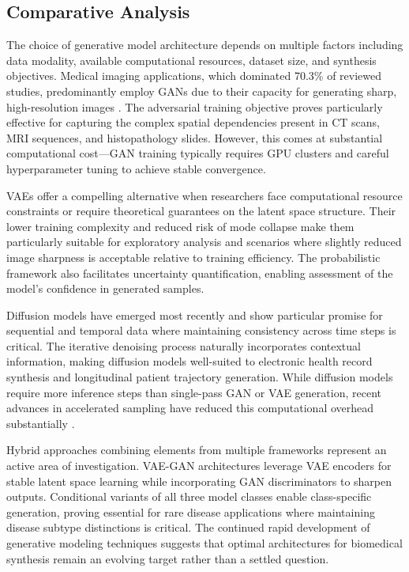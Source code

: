 \subsection{Comparative Analysis}

The choice of generative model architecture depends on multiple factors including data modality, available computational resources, dataset size, and synthesis objectives. Medical imaging applications, which dominated 70.3\% of reviewed studies, predominantly employ GANs due to their capacity for generating sharp, high-resolution images \cite{finetti2025data}. The adversarial training objective proves particularly effective for capturing the complex spatial dependencies present in CT scans, MRI sequences, and histopathology slides. However, this comes at substantial computational cost---GAN training typically requires GPU clusters and careful hyperparameter tuning to achieve stable convergence.

VAEs offer a compelling alternative when researchers face computational resource constraints or require theoretical guarantees on the latent space structure. Their lower training complexity and reduced risk of mode collapse make them particularly suitable for exploratory analysis and scenarios where slightly reduced image sharpness is acceptable relative to training efficiency. The probabilistic framework also facilitates uncertainty quantification, enabling assessment of the model's confidence in generated samples.

Diffusion models have emerged most recently and show particular promise for sequential and temporal data where maintaining consistency across time steps is critical. The iterative denoising process naturally incorporates contextual information, making diffusion models well-suited to electronic health record synthesis and longitudinal patient trajectory generation. While diffusion models require more inference steps than single-pass GAN or VAE generation, recent advances in accelerated sampling have reduced this computational overhead substantially \cite{zhong2024meddiffusion}.

Hybrid approaches combining elements from multiple frameworks represent an active area of investigation. VAE-GAN architectures leverage VAE encoders for stable latent space learning while incorporating GAN discriminators to sharpen outputs. Conditional variants of all three model classes enable class-specific generation, proving essential for rare disease applications where maintaining disease subtype distinctions is critical. The continued rapid development of generative modeling techniques suggests that optimal architectures for biomedical synthesis remain an evolving target rather than a settled question.
